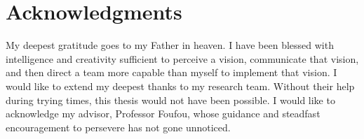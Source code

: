 \chapter*{Acknowledgments}

My deepest gratitude goes to my Father in heaven.  I have been blessed with intelligence and creativity sufficient to perceive a vision, communicate that vision, and then direct a team more capable than myself to implement that vision.  I would like to extend my deepest thanks to my research team. Without their help during trying times, this thesis would not have been possible. I would like to acknowledge my advisor, Professor Foufou, whose guidance and steadfast encouragement to persevere has not gone unnoticed. 
